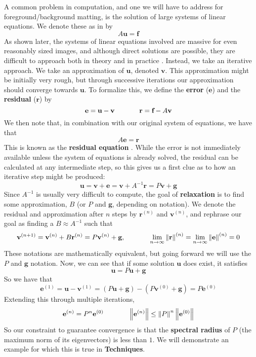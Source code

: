 A common problem in computation, and one we will have to address for foreground/background matting, is the solution of large systems of linear equations. We denote these as in \cite{briggs87} by
\[A\textbf{u}=\textbf{f}\]
As shown later, the systems of linear equations involved are massive for even reasonably sized images, and although direct solutions are possible, they are difficult to approach both in theory \cite[pg.4]{briggs87} and in practice \cite{lee14}. Instead, we take an iterative approach. We take an approximation of $\textbf{u}$, denoted $\textbf{v}$. This approximation might be initially very rough, but through successive iterations our approximation should converge towards $\textbf{u}$. To formalize this, we define the \textbf{error} ($\textbf{e}$) and the \textbf{residual} ($\textbf{r}$) by
\[\textbf{e}=\textbf{u}-\textbf{v}\hspace{.5in}
  \textbf{r}=\textbf{f}-A\textbf{v}\]
We then note that, in combination with our original system of equations, we have that
\[A\textbf{e}=\textbf{r}\]
This is known as the \textbf{residual equation} \cite{briggs87}. While the error is not immediately available unless the system of equations is already solved, the residual can be calculated at any intermediate step, so this gives us a first clue as to how an iterative step might be produced:
\[\textbf{u}=\textbf{v}+\textbf{e}=
	\textbf{v}+A^{-1}\textbf{r}=P\textbf{v}+\textbf{g}\]
Since $A^{-1}$ is usually very difficult to compute, the goal of \textbf{relaxation} is to find some approximation, $B$ (or $P$ and $\textbf{g}$, depending on notation). We denote the residual and approximation after $n$ steps by $\textbf{r}^{(n)}$ and $\textbf{v}^{(n)}$, and rephrase our goal as finding a $B\approx A^{-1}$ such that
\[\textbf{v}^{(n+1)}=\textbf{v}^{(n)}+B\textbf{r}^{(n)}
	=P\textbf{v}^{(n)}+\textbf{g},
\hspace{.5in}
	\lim\limits_{n\to\infty}
		\left\Vert\textbf{r}\right\Vert^{(n)}=
	\lim\limits_{n\to\infty}
	\left\Vert\textbf{e}\right\Vert^{(n)}=0\]
These notations are mathematically equivalent, but going forward we will use the $P$ and $\textbf{g}$ notation. Now, we can see that if some solution $\textbf{u}$ does exist, it satisfies
\[\textbf{u}=P\textbf{u}+\textbf{g}\]
So we have that
\[\textbf{e}^{(1)}=\textbf{u}-\textbf{v}^{(1)}
=(P\textbf{u}+\textbf{g})-(P\textbf{v}^{(0)}+\textbf{g})
=P\textbf{e}^{(0)}\]
Extending this through multiple iterations,
\[\textbf{e}^{(n)}=P^n\textbf{e}^{(0)}\hspace{.5in}
\left\Vert\textbf{e}^{(n)}\right\Vert\leq
\left\Vert P\right\Vert^n
	\left\Vert\textbf{e}^{(0)}\right\Vert\]
So our constraint to guarantee convergence is that the \textbf{spectral radius} of $P$ (the maximum norm of its eigenvectors) is less than $1$. We will demonstrate an example for which this is true in \textbf{Techniques}.